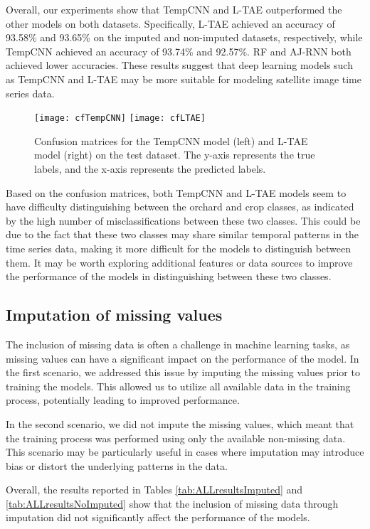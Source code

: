 Overall, our experiments show that TempCNN and L-TAE outperformed the other models on both datasets.
Specifically, L-TAE achieved an accuracy of 93.58\% and 93.65\% on the imputed and non-imputed datasets, respectively, 
while TempCNN achieved an accuracy of 93.74\% and 92.57\%. RF and AJ-RNN both achieved lower accuracies. 
These results suggest that deep learning models such as TempCNN and L-TAE may be more suitable for modeling satellite image time series data.

\begin{figure}[H]
  \centering
  \texttt{[image: cfTempCNN]}
  \texttt{[image: cfLTAE]}
  \caption{Confusion matrices for the TempCNN model (left) and L-TAE model (right) on the test dataset. The y-axis represents the true labels, and the x-axis represents the predicted labels.}
\end{figure}

Based on the confusion matrices, both TempCNN and L-TAE models seem to have difficulty distinguishing between the orchard and crop classes, as indicated by the high number of misclassifications between these two classes.
This could be due to the fact that these two classes may share similar temporal patterns in the time series data, making it more difficult for the models to distinguish between them. 
It may be worth exploring additional features or data sources to improve the performance of the models in distinguishing between these two classes.

\subsection{Imputation of missing values}

The inclusion of missing data is often a challenge in machine learning tasks, as missing values can have a significant impact on the performance of the model.
In the first scenario, we addressed this issue by imputing the missing values prior to training the models. 
This allowed us to utilize all available data in the training process, potentially leading to improved performance.

In the second scenario, we did not impute the missing values, which meant that the training process was performed using only the available non-missing data.
This scenario may be particularly useful in cases where imputation may introduce bias or distort the underlying patterns in the data.

Overall, the results reported in Tables \ref{tab:ALLresultsImputed} and \ref{tab:ALLresultsNoImputed} show that the inclusion of missing data through imputation did not significantly affect the performance of the models.